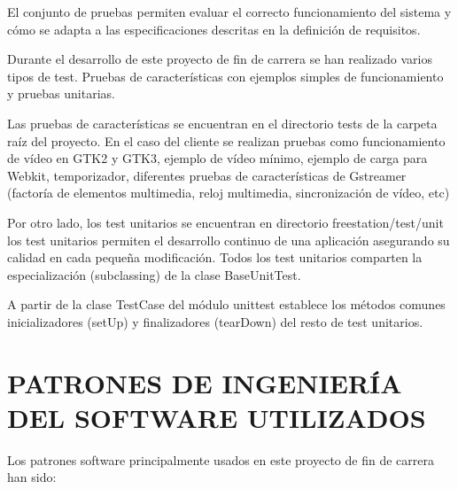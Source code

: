 El conjunto de pruebas permiten evaluar el correcto funcionamiento del sistema y
cómo se adapta a las especificaciones descritas en la definición de requisitos.

Durante el desarrollo de este proyecto de fin de carrera se han realizado varios
tipos de test. Pruebas de características con ejemplos simples de funcionamiento
y pruebas unitarias.

Las pruebas de características se encuentran en el directorio tests de la
carpeta raíz del proyecto. En el caso del cliente se realizan pruebas como
funcionamiento de vídeo en GTK2 y GTK3, ejemplo de vídeo mínimo, ejemplo de
carga para Webkit, temporizador, diferentes pruebas de características de
Gstreamer (factoría de elementos multimedia, reloj multimedia, sincronización
de vídeo, etc)

Por otro lado, los test unitarios se encuentran en directorio
freestation/test/unit los test unitarios permiten el desarrollo continuo de una
aplicación asegurando su calidad en cada pequeña modificación. Todos los 
test unitarios comparten la especialización (subclassing) de la clase 
BaseUnitTest. 

A partir de la clase TestCase del módulo unittest establece los métodos comunes
inicializadores (setUp) y finalizadores (tearDown) del resto de test unitarios.

\newpage

\section{\uppercase{Patrones de ingeniería del software utilizados}}
\label{sec:patrones}
Los patrones software\cite{GHe06} principalmente usados en este proyecto de fin
de carrera han sido:

